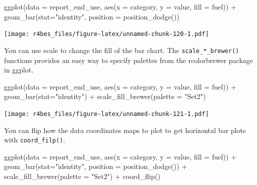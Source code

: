 \documentclass[
]{book}
\newenvironment{Shaded}{\begin{snugshade}}{\end{snugshade}}
\newcommand{\AttributeTok}[1]{\textcolor[rgb]{0.77,0.63,0.00}{#1}}
\newcommand{\FunctionTok}[1]{\textcolor[rgb]{0.00,0.00,0.00}{#1}}
\newcommand{\NormalTok}[1]{#1}
\newcommand{\SpecialCharTok}[1]{\textcolor[rgb]{0.00,0.00,0.00}{#1}}
\newcommand{\StringTok}[1]{\textcolor[rgb]{0.31,0.60,0.02}{#1}}
\begin{document}
\begin{Shaded}
\begin{Highlighting}[]
\FunctionTok{ggplot}\NormalTok{(}\AttributeTok{data =}\NormalTok{ report\_end\_use, }\FunctionTok{aes}\NormalTok{(}\AttributeTok{x =}\NormalTok{ category, }\AttributeTok{y =}\NormalTok{ value, }\AttributeTok{fill =}\NormalTok{ fuel)) }\SpecialCharTok{+}
    \FunctionTok{geom\_bar}\NormalTok{(}\AttributeTok{stat=}\StringTok{"identity"}\NormalTok{, }\AttributeTok{position =} \FunctionTok{position\_dodge}\NormalTok{())}
\end{Highlighting}
\end{Shaded}

\texttt{[image: r4bes\_files/figure-latex/unnamed-chunk-120-1.pdf]}

You can use scale to change the fill of the bar chart. The \texttt{scale\_*\_brewer()} functions provides an easy way to specify palettes from the rcolorbrewer package in ggplot.

\begin{Shaded}
\begin{Highlighting}[]
\FunctionTok{ggplot}\NormalTok{(}\AttributeTok{data =}\NormalTok{ report\_end\_use, }\FunctionTok{aes}\NormalTok{(}\AttributeTok{x =}\NormalTok{ category, }\AttributeTok{y =}\NormalTok{ value, }\AttributeTok{fill =}\NormalTok{ fuel)) }\SpecialCharTok{+}
    \FunctionTok{geom\_bar}\NormalTok{(}\AttributeTok{stat=}\StringTok{"identity"}\NormalTok{) }\SpecialCharTok{+} 
    \FunctionTok{scale\_fill\_brewer}\NormalTok{(}\AttributeTok{palette =} \StringTok{"Set2"}\NormalTok{) }
\end{Highlighting}
\end{Shaded}

\texttt{[image: r4bes\_files/figure-latex/unnamed-chunk-121-1.pdf]}

You can flip how the data coordinates maps to plot to get horizontal bar plots with \texttt{coord\_filp()}.

\begin{Shaded}
\begin{Highlighting}[]
\FunctionTok{ggplot}\NormalTok{(}\AttributeTok{data =}\NormalTok{ report\_end\_use, }\FunctionTok{aes}\NormalTok{(}\AttributeTok{x =}\NormalTok{ category, }\AttributeTok{y =}\NormalTok{ value, }\AttributeTok{fill =}\NormalTok{ fuel)) }\SpecialCharTok{+}
    \FunctionTok{geom\_bar}\NormalTok{(}\AttributeTok{stat=}\StringTok{"identity"}\NormalTok{, }\AttributeTok{position =} \FunctionTok{position\_dodge}\NormalTok{()) }\SpecialCharTok{+} 
    \FunctionTok{scale\_fill\_brewer}\NormalTok{(}\AttributeTok{palette =} \StringTok{"Set2"}\NormalTok{) }\SpecialCharTok{+}
    \FunctionTok{coord\_flip}\NormalTok{()}
\end{Highlighting}
\end{Shaded}
\end{document}
